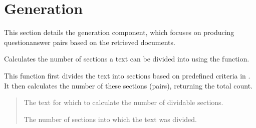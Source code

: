 \documentclass[letterpaper,10pt,english,openany,oneside]{sphinxmanual}
\begin{document}
\sphinxstepscope


\chapter{Generation}
\label{\detokenize{generation:generation}}\label{\detokenize{generation::doc}}
\sphinxAtStartPar
This section details the generation component, which focuses on producing question\sphinxhyphen{}answer pairs based on the retrieved documents.
\label{\detokenize{generation:module-tools.pipeline}}

\begin{fulllineitems}
\label{\detokenize{generation:tools.pipeline.calculate_num_pairs}}
\pysigstartsignatures
{}
\pysigstopsignatures
\sphinxAtStartPar
Calculates the number of sections a text can be divided into using the  function.

\sphinxAtStartPar
This function first divides the text into sections based on predefined criteria in .
It then calculates the number of these sections (pairs), returning the total count.
\begin{quote}\begin{description}
\sphinxAtStartPar
{} \textendash{} The text for which to calculate the number of dividable sections.

\sphinxAtStartPar
The number of sections into which the text was divided.

\end{description}\end{quote}

\end{fulllineitems}

\end{document}
